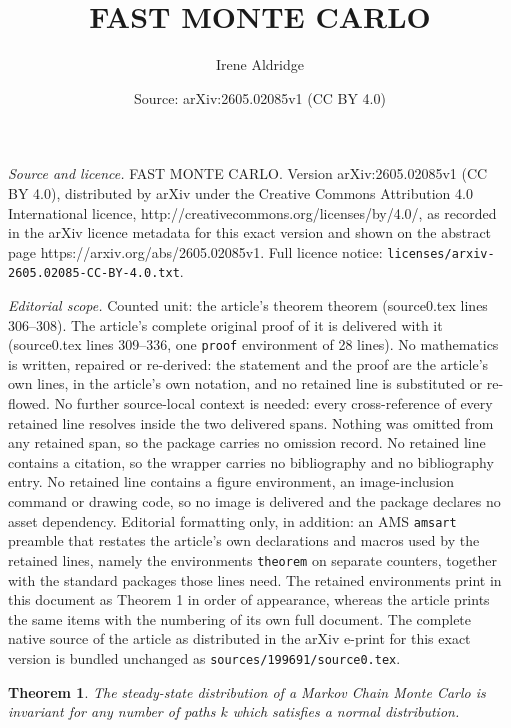 \documentclass[10pt,a4paper]{amsart}
\title{FAST MONTE CARLO}
\author{Irene Aldridge}
\date{Source: arXiv:2605.02085v1 (CC BY 4.0)}
\newtheorem{theorem}{Theorem}
\begin{document}
\maketitle

\noindent\emph{Source and licence.} FAST MONTE CARLO. Version arXiv:2605.02085v1 (CC BY 4.0), distributed by arXiv under the Creative Commons Attribution 4.0 International licence, http://creativecommons.org/licenses/by/4.0/, as recorded in the arXiv licence metadata for this exact version and shown on the abstract page https://arxiv.org/abs/2605.02085v1. Full licence notice: \texttt{licenses/arxiv-2605.02085-CC-BY-4.0.txt}.\par\smallskip

\noindent\textit{Editorial scope.} Counted unit: the article's theorem theorem (source0.tex lines 306--308). The article's complete original proof of it is delivered with it (source0.tex lines 309--336, one \texttt{proof} environment of 28 lines). No mathematics is written, repaired or re-derived: the statement and the proof are the article's own lines, in the article's own notation, and no retained line is substituted or re-flowed.  No further source-local context is needed: every cross-reference of every retained line resolves inside the two delivered spans.  Nothing was omitted from any retained span, so the package carries no omission record.  No retained line contains a citation, so the wrapper carries no bibliography and no bibliography entry.  No retained line contains a figure environment, an image-inclusion command or drawing code, so no image is delivered and the package declares no asset dependency.  Editorial formatting only, in addition: an AMS \texttt{amsart} preamble that restates the article's own declarations and macros used by the retained lines, namely the environments \texttt{theorem} on separate counters, together with the standard packages those lines need.  The retained environments print in this document as Theorem 1 in order of appearance, whereas the article prints the same items with the numbering of its own full document.  The complete native source of the article as distributed in the arXiv e-print for this exact version is bundled unchanged as \texttt{sources/199691/source0.tex}.
\begin{theorem}
    The steady-state distribution of a Markov Chain Monte Carlo is invariant for any number of paths $k$ which satisfies a normal distribution.  
\end{theorem}
\end{document}
